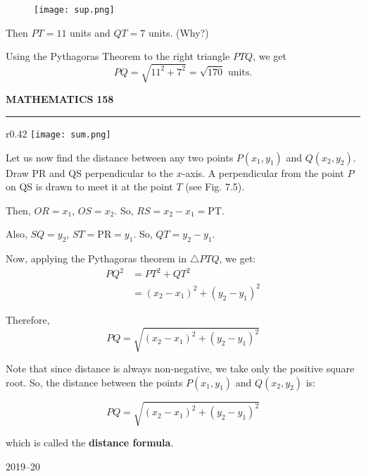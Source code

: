 \documentclass[11pt]{article}
\begin{document}
\vspace{1.5em}

\begin{figure}[H]
    \centering
    \texttt{[image: sup.png]}
\end{figure}

Then \(PT = 11\) units and \(QT = 7\) units. (Why?)

Using the Pythagoras Theorem to the right triangle \(PTQ\), we get
\[
PQ = \sqrt{11^2 + 7^2} = \sqrt{170} \text{ units}.
\]




\vspace{3em}

{\color{ncertblue}\textbf{MATHEMATICS}} \hfill \textbf{158}

{\color{ncertblue}\noindent\rule{\textwidth}{0.5pt}}

\vspace{0.5em}

\begin{wrapfigure}{r}{0.42\textwidth}
    \centering
    \vspace{-1em}
    \texttt{[image: sum.png]}
    \vspace{-1em}
\end{wrapfigure}

\hspace{2em} Let us now find the distance between any two points \(P(x_1, y_1)\) and \(Q(x_2, y_2)\). Draw PR and QS perpendicular to the \(x\)-axis. A perpendicular from the point \(P\) on QS is drawn to meet it at the point \(T\) (see Fig. 7.5).

Then, \(OR = x_1\), \(OS = x_2\). So, \(RS = x_2 - x_1 = \text{PT}\).

Also, \(SQ = y_2\), \(ST = \text{PR} = y_1\). So, \(QT = y_2 - y_1\).

Now, applying the Pythagoras theorem in \(\triangle PTQ\), we get:
\[
\begin{aligned}
PQ^2 &= PT^2 + QT^2 \\
     &= (x_2 - x_1)^2 + (y_2 - y_1)^2
\end{aligned}
\]

Therefore,
\[
PQ = \sqrt{(x_2 - x_1)^2 + (y_2 - y_1)^2}
\]

Note that since distance is always non-negative, we take only the positive square root. So, the distance between the points \(P(x_1, y_1)\) and \(Q(x_2, y_2)\) is:

{\boldmath
\[
PQ = \sqrt{(x_2 - x_1)^2 + (y_2 - y_1)^2}
\]
}

which is called the \textbf{distance formula}.

\vspace{33em}
\begin{center}
    2019--20
\end{center}
\end{document}
